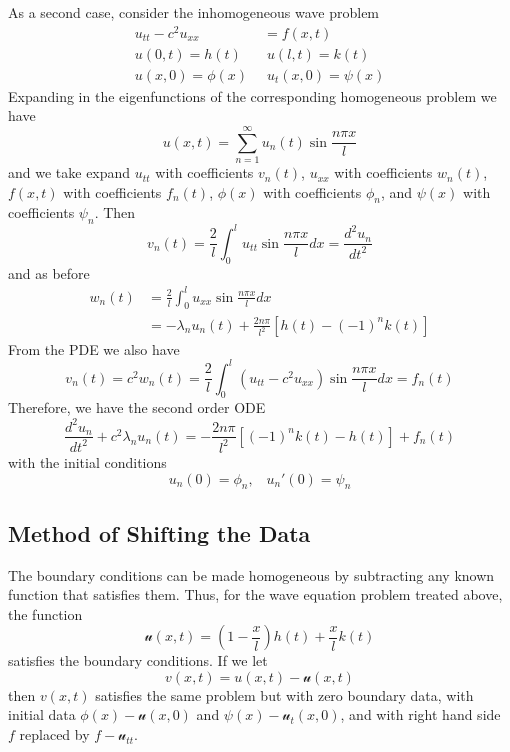 As a second case, consider the inhomogeneous wave problem \begin{align*}
    u_{tt}-c^2u_{xx}&=f(x,t) \\
    u(0,t) = h(t)\;&\;u(l,t) = k(t) \\
    u(x,0) = \phi(x)\;&\;u_t(x,0) = \psi(x)
\end{align*}
Expanding in the eigenfunctions of the corresponding homogeneous problem we have \begin{equation*}
    u(x,t) = \sum_{n=1}^{\infty}u_n(t)\sin\frac{n\pi x}{l}
\end{equation*}
and we take expand $u_{tt}$ with coefficients $v_n(t)$, $u_{xx}$ with coefficients $w_n(t)$, $f(x,t)$ with coefficients $f_n(t)$, $\phi(x)$ with coefficients $\phi_n$, and $\psi(x)$ with coefficients $\psi_n$. Then \begin{equation*}
    v_n(t) = \frac{2}{l}\int_0^lu_{tt}\sin\frac{n\pi x}{l}dx = \frac{d^2u_n}{dt^2}
\end{equation*}
and as before \begin{align*}
    w_n(t) &= \frac{2}{l}\int_0^lu_{xx}\sin\frac{n\pi x}{l}dx \\
    &= -\lambda_nu_n(t) + \frac{2n\pi}{l^2}\left[h(t) - (-1)^nk(t)\right]
\end{align*}
From the PDE we also have \begin{equation*}
    v_n(t) = c^2w_n(t) = \frac{2}{l}\int_0^l(u_{tt}-c^2u_{xx})\sin\frac{n\pi x}{l}dx = f_n(t)
\end{equation*}
Therefore, we have the second order ODE \begin{equation*}
    \frac{d^2u_n}{dt^2} + c^2\lambda_nu_n(t) = -\frac{2n\pi}{l^2}\left[(-1)^nk(t) - h(t)\right] + f_n(t)
\end{equation*}
with the initial conditions \begin{equation*}
    u_n(0) = \phi_n,\;\;\;u_n'(0) = \psi_n
\end{equation*}

\subsection{Method of Shifting the Data}

The boundary conditions can be made homogeneous by subtracting any known function that satisfies them. Thus, for the wave equation problem treated above, the function \begin{equation*}
    \mathscr{u}(x,t) = \left(1-\frac{x}{l}\right)h(t) + \frac{x}{l}k(t)
\end{equation*}
satisfies the boundary conditions. If we let \begin{equation*}
    v(x,t) = u(x,t) - \mathscr{u}(x,t)
\end{equation*}
then $v(x,t)$ satisfies the same problem but with zero boundary data, with initial data $\phi(x) - \mathscr{u}(x,0)$ and $\psi(x) - \mathscr{u}_t(x,0)$, and with right hand side $f$ replaced by $f-\mathscr{u}_{tt}$. 

